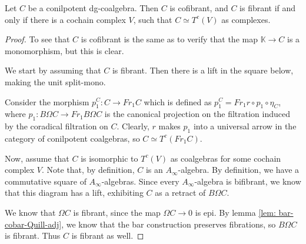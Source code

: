 \documentclass[../thesis.tex]{subfiles}
\begin{document}
        \begin{proposition}
            Let $C$ be a conilpotent dg-coalgebra. Then $C$ is cofibrant, and $C$ is fibrant if and only if there is a cochain complex $V$, such that $C \simeq T^c(V)$ as complexes.
        \end{proposition}

        \begin{proof}
            To see that $C$ is cofibrant is the same as to verify that the map $\mathbb{K}\rightarrow C$ is a monomorphism, but this is clear.

            We start by assuming that $C$ is fibrant. Then there is a lift in the square below, making the unit split-mono.
            \begin{center}
            \end{center}
            Consider the morphism $p_1^C : C \rightarrow Fr_1C$ which is defined as $p_1^C = Fr_1r\circ p_1\circ \eta_C$, where $p_1 : B\Omega C \rightarrow Fr_1 B\Omega C$ is the canonical projection on the filtration induced by the coradical filtration on $C$. Clearly, $r$ makes $p_1$ into a universal arrow in the category of conilpotent coalgebras, so $C \simeq T^c(Fr_1C)$.

            Now, assume that $C$ is isomorphic to $T^c(V)$ as coalgebras for some cochain complex $V$. Note that, by definition, $C$ is an $A_\infty$-algebra. By definition, we have a commutative square of $A_\infty$-algebras. Since every $A_\infty$-algebra is bifibrant, we know that this diagram has a lift, exhibiting $C$ as a retract of $B\Omega C$.
            \begin{center}
            \end{center}

            We know that $\Omega C$ is fibrant, since the map $\Omega C \rightarrow 0$ is epi. By lemma \ref{lem: bar-cobar-Quill-adj}, we know that the bar construction preserves fibrations, so $B\Omega C$ is fibrant. Thus $C$ is fibrant as well.
        \end{proof}
\end{document}
